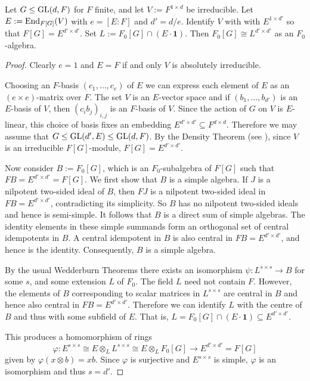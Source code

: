 \begin{Prop} 
\label{pfenvalgI}
Let $G \leq \GL(d,F)$ for $F$ finite, 
and let $V := F^{1 \times d}$ be irreducible.
Let $E := \End_{F[G]}(V)$ with  $e = [E:F]$ and $d' = d/e$. Identify $V$ with 
with $E^{1 \times d'}$ %
so that $F[G] = E^{d' \times d'}$. Set $L := F_0[G] \cap (E \cdot
\mathbf{1})$.
 Then $F_0[G] \cong L^{d' \times d'}$ as an
$F_0$-algebra.
\end{Prop}
\begin{proof}
Clearly $e = 1$ and  $E=F$ if and only $V$ is absolutely irreducible.

Choosing an $F$-basis $(c_1,\ldots,c_e)$ of $E$ we can express each element 
of $E$ as an $(e\times e)$-matrix over $F$.
The set $V$ is an $E$-vector space and if $(b_1, \ldots, b_{d'})$ is an
$E$-basis of $V$, then $(c_ib_j)_{i,j}$ is
an $F$-basis of $V$. Since the action of $G$ on $V$ is
$E$-linear, this choice of basis fixes an embedding
$E^{d' \times d'} \subseteq F^{d \times d}$. Therefore we may assume that
$G \le \GL(d',E) \le \GL(d,F)$.
By the Density Theorem (see \cite[(3.27)]{CRI}), since $V$ is an
irreducible $F[G]$-module, $F[G] = E^{d' \times d'}$.

Now consider $B := F_0[G]$, which is an $F_0$-subalgebra of 
$F[G]$ such that $FB = E^{d'\times d'} = F[G]$. We first show
that $B$ is a simple algebra. If $J$ is a nilpotent 
two-sided ideal of $B$, then $FJ$ is a nilpotent two-sided ideal in 
$FB = E^{d' \times d'}$, contradicting its simplicity. So $B$ has no 
nilpotent two-sided 
ideals and hence is semi-simple. It follows that $B$ is a direct sum of
simple algebras. The identity elements in these simple summands form an
orthogonal set of central idempotents in $B$. A central
idempotent in $B$ is also central in $FB = E^{d' \times d'}$, and hence is 
the identity.
Consequently, $B$ is a simple algebra.

By the usual Wedderburn Theorems there exists an isomorphism
 $\psi: L^{s \times s} \rightarrow B$
for some $s$,  and some extension $L$ of $F_0$. 
The field $L$ need not contain $F$. However,  the elements of $B$ corresponding
to scalar matrices in $L^{s \times s}$ are central in $B$ and hence also
central in $FB = E^{d' \times d'}$. Therefore we can identify
$L$ with the centre of $B$ and thus with some subfield of $E$.
That is, $L = F_0[G] \cap (E \cdot \mathbf{1}) 
\subseteq E^{d' \times d'}$.

This produces a homomorphism of rings
\[ \varphi: E^{s \times s} \cong E \otimes_L L^{s \times s} \cong
   E \otimes_L F_0[G] \to E^{d' \times d'} = F[G] \]
given by $\varphi(x \otimes b) = xb$. Since $\varphi$ is surjective and
$E^{s \times s}$ is simple, $\varphi$ is an isomorphism and thus
$s = d'$.
\end{proof}

